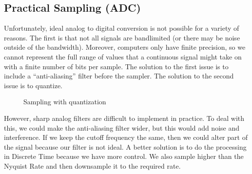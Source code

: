 \subsection{Practical Sampling (ADC)}
Unfortunately, ideal analog to digital conversion is not possible for a variety of reasons. The first is that not all signals are bandlimited (or there may be noise outside of the bandwidth).
Moreover, computers only have finite precision, so we cannot represent the full range of values that a continuous signal might take on with a finite number of bits per sample. The solution to the first issue is to include a ``anti-aliasing'' filter before the sampler. 
The solution to the second issue is to quantize.
\begin{gitbook-image}
\begin{figure}[!h]
  \centering
  \caption{Sampling with quantization}
  \label{fig:quantizer}
\end{figure}
\end{gitbook-image}
However, sharp analog filters are difficult to implement in practice. To deal with this,
we could make the anti-aliasing filter wider, but this would add noise and interference. If we keep the cutoff frequency the same,
then we could alter part of the signal because our filter is not ideal. A better solution is to do the processing in Discrete Time
because we have more control. We also sample higher than the Nyquist Rate and then downsample it to the required rate.
